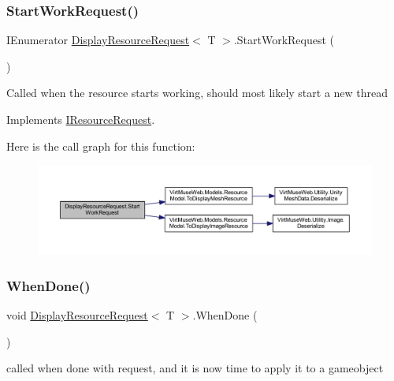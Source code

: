 \subsubsection{\texorpdfstring{Start\+Work\+Request()}{StartWorkRequest()}}
{\footnotesize\ttfamily I\+Enumerator \mbox{\hyperlink{class_display_resource_request}{Display\+Resource\+Request}}$<$ T $>$.Start\+Work\+Request (\begin{DoxyParamCaption}{ }\end{DoxyParamCaption})}



Called when the resource starts working, should most likely start a new thread 



Implements \mbox{\hyperlink{interface_i_resource_request_a5b40a09cb820283600ac9e3f846936f9}{I\+Resource\+Request}}.

Here is the call graph for this function\+:
\nopagebreak
\begin{figure}[H]
\begin{center}
\leavevmode
\includegraphics[width=350pt]{class_display_resource_request_ab447f9d42e473b8bc8839c6f3d306a17_cgraph}
\end{center}
\end{figure}
\mbox{\label{class_display_resource_request_a60a8a75088ba20c6c42ebcab8309f1de}} 
\subsubsection{\texorpdfstring{When\+Done()}{WhenDone()}}
{\footnotesize\ttfamily void \mbox{\hyperlink{class_display_resource_request}{Display\+Resource\+Request}}$<$ T $>$.When\+Done (\begin{DoxyParamCaption}{ }\end{DoxyParamCaption})}



called when done with request, and it is now time to apply it to a gameobject 



